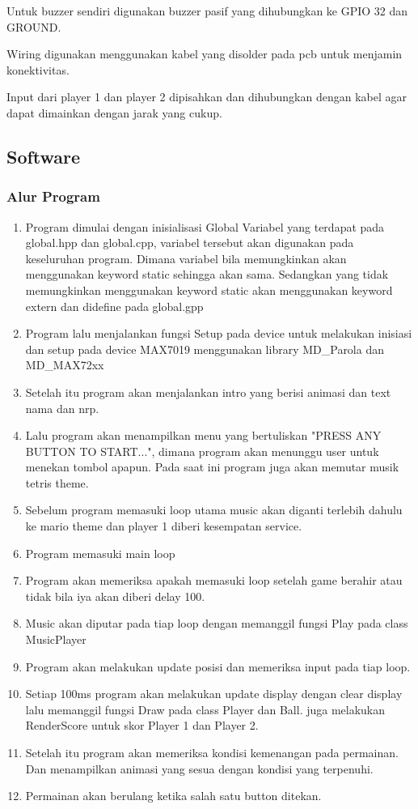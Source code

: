\documentclass[a4paper,12pt]{article}
\begin{document}
Untuk buzzer sendiri digunakan buzzer pasif yang dihubungkan ke GPIO 32 dan GROUND.

Wiring digunakan menggunakan kabel yang disolder pada pcb untuk menjamin konektivitas.

Input dari player 1 dan player 2 dipisahkan dan dihubungkan dengan kabel agar dapat dimainkan dengan jarak yang cukup.

\subsection{Software}
\subsubsection{Alur Program}
\begin{enumerate}
    \item Program dimulai dengan inisialisasi Global Variabel yang terdapat pada global.hpp dan global.cpp, variabel tersebut
        akan digunakan pada keseluruhan program. Dimana variabel bila memungkinkan akan menggunakan keyword static sehingga akan sama. Sedangkan
        yang tidak memungkinkan menggunakan keyword static akan menggunakan keyword extern dan didefine pada global.gpp
    \item Program lalu menjalankan fungsi Setup pada device untuk melakukan inisiasi dan setup pada device MAX7019
        menggunakan library MD\_Parola dan MD\_MAX72xx
    \item Setelah itu program akan menjalankan intro yang berisi animasi dan text nama dan nrp.
    \item Lalu program akan menampilkan menu yang bertuliskan "PRESS ANY BUTTON TO START...", dimana program
        akan menunggu user untuk menekan tombol apapun. Pada saat ini program juga akan memutar musik tetris theme.
    \item Sebelum program memasuki loop utama music akan diganti terlebih dahulu ke mario theme dan player 1 diberi kesempatan service.
    \item Program memasuki main loop
    \item Program akan memeriksa apakah memasuki loop setelah game berahir atau tidak bila iya akan diberi delay 100.
    \item Music akan diputar pada tiap loop dengan memanggil fungsi Play pada class MusicPlayer
    \item Program akan melakukan update posisi dan memeriksa input pada tiap loop.
    \item Setiap 100ms program akan melakukan update display dengan clear display lalu memanggil fungsi Draw pada
        class Player dan Ball. juga melakukan RenderScore untuk skor Player 1 dan Player 2.
    \item Setelah itu program akan memeriksa kondisi kemenangan pada permainan. Dan menampilkan animasi yang sesua dengan kondisi
        yang terpenuhi.
    \item Permainan akan berulang ketika salah satu button ditekan.
\end{enumerate}
\end{document}
